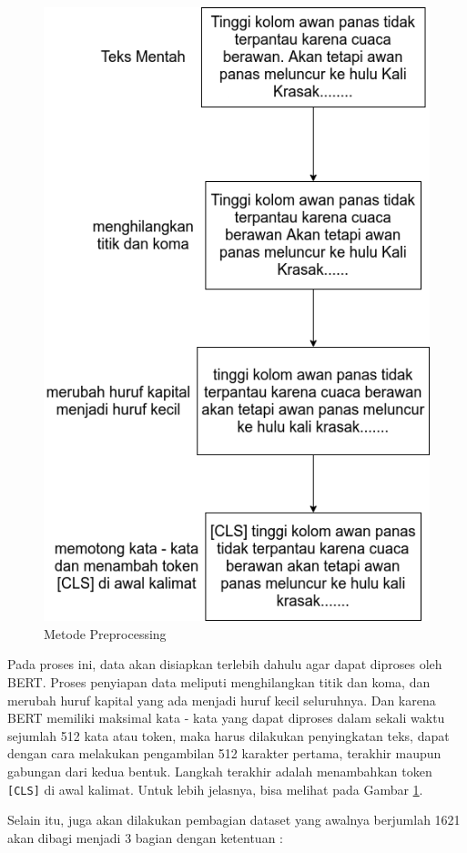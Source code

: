\begin{figure}[h!]
    \begin{center}
        \includegraphics[width= .7\linewidth]{gambar/preprocess_long.png}
        \caption{Metode Preprocessing}
        \label{fig: metodologi_preprocessing}
    \end{center}
\end{figure}

Pada proses ini, data akan disiapkan terlebih dahulu agar dapat diproses oleh BERT. Proses penyiapan data meliputi menghilangkan titik dan koma, dan merubah huruf kapital yang ada menjadi huruf kecil seluruhnya. Dan karena BERT memiliki maksimal kata - kata yang dapat diproses dalam sekali waktu sejumlah 512 kata atau token, maka harus dilakukan penyingkatan teks, dapat dengan cara melakukan pengambilan 512 karakter pertama, terakhir maupun gabungan dari kedua bentuk. Langkah terakhir adalah menambahkan token \texttt{[CLS]} di awal kalimat. Untuk lebih jelasnya, bisa melihat pada Gambar \ref{fig: metodologi_preprocessing}.

Selain itu, juga akan dilakukan pembagian dataset yang awalnya berjumlah 1621 akan dibagi menjadi 3 bagian dengan ketentuan :

